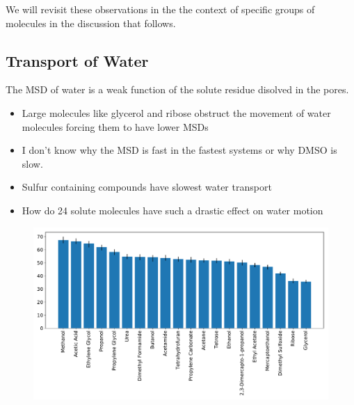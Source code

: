 \documentclass{article}
\begin{document}
  
  We will revisit these observations in the the context of specific groups of 
  molecules in the discussion that follows.


  \subsection*{Transport of Water}

  The MSD of water is a weak function of the solute residue disolved in
  the pores.
  \begin{itemize}
  	\item Large molecules like glycerol and ribose obstruct the movement
  	of water molecules forcing them to have lower MSDs
  	\item I don't know why the MSD is fast in the fastest systems or why DMSO is slow.
  	\item Sulfur containing compounds have slowest water transport
  	\item How do 24 solute molecules have such a drastic effect on water motion
  \end{itemize}

  \begin{figure}
  \centering
  \includegraphics[width=\textwidth]{water_msd.pdf}
  \caption{}\label{fig:water_msd}
  \end{figure}
  
\end{document}
